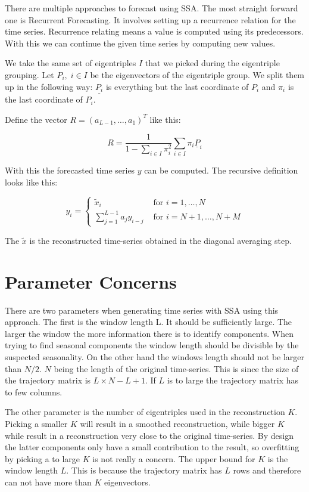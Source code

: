 There are multiple approaches to forecast using SSA. The most straight forward one is Recurrent Forecasting. It involves setting up a recurrence relation for the time series. Recurrence relating means a value is computed using its predecessors. With this we can continue the given time series by computing new values. 

We take the same set of eigentriples $I$ that we picked during the eigentriple grouping. Let $P_i, \; i \in I$ be the eigenvectors of the eigentriple group. We split them up in the following way: $\underline{P_i}$ is everything but the last coordinate of $P_i$ and $\pi_i$ is the last coordinate of $P_i$. 

Define the vector $R = (a_{L-1}, \dots, a_1)^T$ like this:

\begin{equation}
   R=\frac{1}{1-\sum_{i \in I} \pi_{i}^{2}} \sum_{i \in I} \pi_{i} \underline{P}_{i}
   \label{eq:r-def}
\end{equation}

With this the forecasted time series $y$ can be computed. The recursive definition looks like this:

\begin{equation}
  y_{i}=\left\{\begin{array}{ll}
\widetilde{x}_{i} & \text { for } i=1, \ldots, N \\
\sum_{j=1}^{L-1} a_{j} y_{i-j} & \text { for } i=N+1, \ldots, N+M
\end{array}\right. 
\end{equation}

The $\tilde{x}$ is the reconstructed time-series obtained in the diagonal averaging step.  \parencite{golyandina2014basic}

\section{Parameter Concerns}

There are two parameters when generating time series with SSA using this approach. The first is the window length L. It should be sufficiently large. The larger the window the more information there is to identify components. When trying to find seasonal components the window length should be divisible by the suspected seasonality. On the other hand the windows length should not be larger than $N/2$. $N$ being the length of the original time-series. This is since the size of the trajectory matrix is $L \times N-L+1$. If $L$ is to large the trajectory matrix has to few columns. 

The other parameter is the number of eigentriples used in the reconstruction $K$. Picking a smaller $K$ will result in a smoothed reconstruction, while bigger $K$ while result in a reconstruction very close to the original time-series. By design the latter components only have a small contribution to the result, so overfitting by picking a to large $K$ is not really a concern. The upper bound for $K$ is the window length $L$. This is because the trajectory matrix has $L$ rows and therefore can not have more than $K$ eigenvectors. 